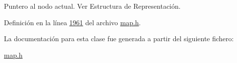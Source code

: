 \-Puntero al nodo actual. \-Ver \-Estructura de \-Representación. 



\-Definición en la línea \hyperlink{map_8h_source_l01961}{1961} del archivo \hyperlink{map_8h_source}{map.\-h}.



\-La documentación para esta clase fue generada a partir del siguiente fichero\-:\begin{DoxyCompactItemize}
\item 
\hyperlink{map_8h}{map.\-h}\end{DoxyCompactItemize}
